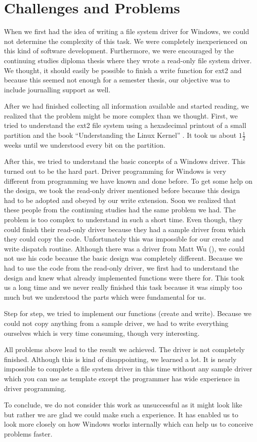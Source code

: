 \chapter{Challenges and Problems}
\label{cha:problems}
When we first had the idea of writing a file system driver for Windows, we could not determine the complexity of this task. We were completely inexperienced on this kind of software development.  Furthermore, we were encouraged by the continuing studies diploma thesis where they wrote a read-only file system driver. We thought, it should easily be possible to finish a write function for ext2 and because this seemed not enough for a semester thesis, our objective was to include journalling support as well.

After we had finished collecting all information available and started reading, we realized that the problem might be more complex than we thought. First, we tried to understand the ext2 file system using a hexadecimal printout of a small partition and the book ``Understanding the Linux Kernel'' \cite{understandingKernel}. It took us about $1\frac{1}{2}$ weeks until we understood every bit on the partition. 

After this, we tried to understand the basic concepts of a Windows driver. This turned out to be the hard part. Driver programming for Windows is very different from programming we have known and done before. To get some help on the design, we took the read-only driver mentioned before because this design had to be adopted and obeyed by our write extension. Soon we realized that these people from the continuing studies had the same problem we had. The problem is too complex to understand in such a short time. Even though, they could finish their read-only driver because they had a sample driver from which they could copy the code. Unfortunately this was impossible for our create and write dispatch routine. Although there was a driver from Matt Wu (\cite{ext2fsd}), we could not use his code because the basic design was completely different. Because we had to use the code from the read-only driver, we first had to understand the design and knew what already implemented functions were there for. This took us a long time and we never really finished this task because it was simply too much but we understood the parts which were fundamental for us.

Step for step, we tried to implement our functions (create and write). Because we could not copy anything from a sample driver, we had to write everything ourselves which is very time consuming, though very interesting. 

All problems above lead to the result we achieved. The driver is not completely finished. Although this is kind of disappointing, we learned a lot. It is nearly impossible to complete a file system driver in this time without any sample driver which you can use as template except the programmer has wide experience in driver programming. 

To conclude, we do not consider this work as unsuccessful as it might look like but rather we are glad we could make such a experience. It has enabled us to look more closely on how Windows works internally which can help us to conceive problems faster.